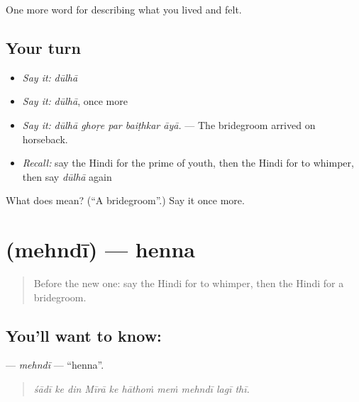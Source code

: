 \begin{grammarlens}[title={What you've built}]
One more word for describing what you lived and felt.
\end{grammarlens}

\subsection*{Your turn}
\begin{itemize}
\raggedright
  \item \emph{Say it:} \emph{dūlhā}
  \item \emph{Say it:} \emph{dūlhā}, once more
  \item \emph{Say it:} \emph{dūlhā ghoṛe par baiṭhkar āyā.} — The bridegroom arrived on horseback.
  \item \emph{Recall:} say the Hindi for the prime of youth, then the Hindi for to whimper, then say \emph{dūlhā} again
\end{itemize}

\begin{tcolorbox}[breakable,colback=teal!4,colframe=teal!35!black,title={Before you move on}]
What does  mean? (\textquotedblleft{}A bridegroom\textquotedblright{}.) Say it once more.
\end{tcolorbox}
\section[\texorpdfstring{\hi{मेहंदी} (mehndī)}{मेहंदी (mehndī)}]{ (mehndī) — henna}

\label{lesson:HI-C500-mehndi}



\begin{quote}
Before the new one: say the Hindi for to whimper, then the Hindi for a bridegroom.
\end{quote}

\subsection*{You'll want to know: }
\textbf{} — \emph{mehndī} — \textquotedblleft{}henna\textquotedblright{}.

\begin{quote}
         
\end{quote}

\begin{quote}
\emph{śādī ke din Mīrā ke hāthoṁ meṁ mehndī lagī thī.}
\end{quote}

